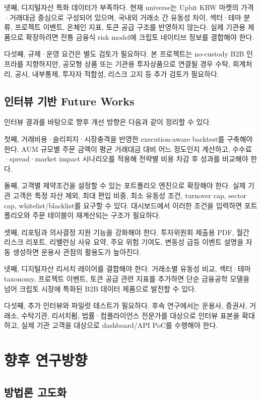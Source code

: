 \documentclass[12pt,a4paper]{article}
\begin{document}
넷째, 디지털자산 특화 데이터가 부족하다. 현재 universe는 Upbit KRW 마켓의 가격·거래대금 중심으로 구성되어 있으며, 국내외 거래소 간 유동성 차이, 섹터·테마 분류, 프로젝트 이벤트, 온체인 지표, 토큰 공급 구조를 반영하지 않는다. 실제 기관용 제품으로 확장하려면 전통 금융식 risk model에 크립토 네이티브 정보를 결합해야 한다.

다섯째, 규제·운영 요건은 별도 검토가 필요하다. 본 프로젝트는 no-custody B2B 인프라를 지향하지만, 공모형 상품 또는 기관용 투자상품으로 연결될 경우 수탁, 회계처리, 공시, 내부통제, 투자자 적합성, 리스크 고지 등 추가 검토가 필요하다.

\subsection{인터뷰 기반 Future Works}

인터뷰 결과를 바탕으로 향후 개선 방향은 다음과 같이 정리할 수 있다.

첫째, 거래비용·슬리피지·시장충격을 반영한 execution-aware backtest를 구축해야 한다. AUM 규모별 주문 금액이 평균 거래대금 대비 어느 정도인지 계산하고, 수수료·spread·market impact 시나리오를 적용해 전략별 비용 차감 후 성과를 비교해야 한다.

둘째, 고객별 제약조건을 설정할 수 있는 포트폴리오 엔진으로 확장해야 한다. 실제 기관 고객은 특정 자산 제외, 최대 편입 비중, 최소 유동성 조건, turnover cap, sector cap, whitelist/blacklist를 요구할 수 있다. 대시보드에서 이러한 조건을 입력하면 포트폴리오와 주문 테이블이 재계산되는 구조가 필요하다.

셋째, 리포팅과 의사결정 지원 기능을 강화해야 한다. 투자위원회 제출용 PDF, 월간 리스크 리포트, 리밸런싱 사유 요약, 주요 위험 기여도, 변동성 급등 이벤트 설명을 자동 생성하면 운용사 관점의 활용도가 높아진다.

넷째, 디지털자산 리서치 레이어를 결합해야 한다. 거래소별 유동성 비교, 섹터·테마 taxonomy, 프로젝트 이벤트, 토큰 공급 관련 지표를 추가하면 단순 금융공학 모델을 넘어 크립토 시장에 특화된 B2B 데이터 제품으로 발전할 수 있다.

다섯째, 추가 인터뷰와 파일럿 테스트가 필요하다. 후속 연구에서는 운용사, 증권사, 거래소, 수탁기관, 리서치펌, 법률·컴플라이언스 전문가를 대상으로 인터뷰 표본을 확대하고, 실제 기관 고객을 대상으로 dashboard/API PoC를 수행해야 한다.


\section{향후 연구방향}

\subsection{방법론 고도화}
\end{document}
